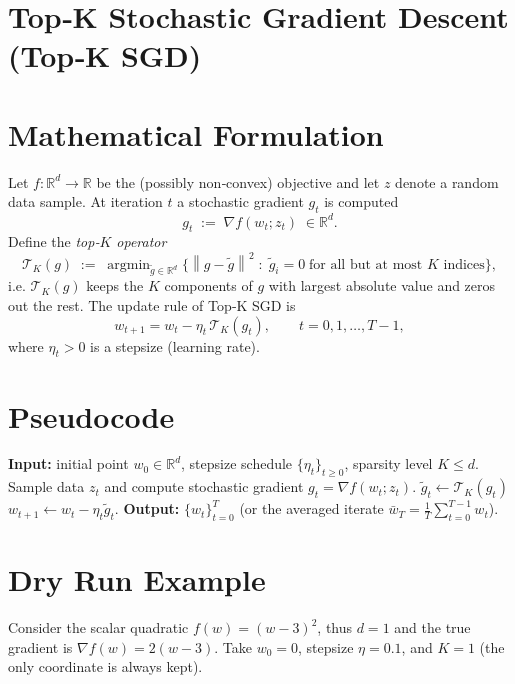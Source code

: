 \documentclass{article}
\newcommand{\R}{\mathbb{R}}
\newcommand{\norm}[1]{\left\|#1\right\|}
\newcommand{\topk}[1]{\mathcal{T}_K\!\left(#1\right)}
\begin{document}
\section*{Top‑K Stochastic Gradient Descent (Top‑K SGD)}

\section*{Mathematical Formulation}
Let $f:\R^{d}\to\R$ be the (possibly non‑convex) objective and let $z$ denote a random data sample.
At iteration $t$ a stochastic gradient $g_t$ is computed
\[
g_t \;:=\; \nabla f(w_t;z_t)\;\in\R^{d}.
\]
Define the \emph{top‑$K$ operator}
\[
\topk{g}\;:=\;\operatorname{argmin}_{\tilde g\in\R^{d}}
\bigl\{ \norm{g-\tilde g}^2 \;:\; \tilde g_i =0\;\text{for all but at most $K$ indices}\bigr\},
\]
i.e. $\topk{g}$ keeps the $K$ components of $g$ with largest absolute value and zeros out the rest.
The update rule of Top‑K SGD is
\begin{equation}
\label{eq:update}
w_{t+1}= w_t - \eta_t \,\topk{g_t},
\qquad t=0,1,\dots,T-1,
\end{equation}
where $\eta_t>0$ is a stepsize (learning rate).  

\section*{Pseudocode}
\begin{algorithm}[H]
\caption{Top‑K SGD}
\begin{algorithmic}[1]
\State \textbf{Input:} initial point $w_0\in\R^{d}$, stepsize schedule $\{\eta_t\}_{t\ge0}$, sparsity level $K\le d$.
    \State Sample data $z_t$ and compute stochastic gradient $g_t=\nabla f(w_t;z_t)$.
    \State $\displaystyle \tilde g_t \gets \topk{g_t}$ 
    \State $w_{t+1} \gets w_t - \eta_t \tilde g_t$.
\EndFor
\State \textbf{Output:} $\{w_t\}_{t=0}^{T}$ (or the averaged iterate $\bar w_T=\frac1T\sum_{t=0}^{T-1}w_t$).
\end{algorithmic}
\end{algorithm}

\section*{Dry Run Example}
Consider the scalar quadratic $f(w)=(w-3)^2$, thus $d=1$ and the true gradient is $\nabla f(w)=2(w-3)$.
Take $w_0=0$, stepsize $\eta=0.1$, and $K=1$ (the only coordinate is always kept).
\end{document}
